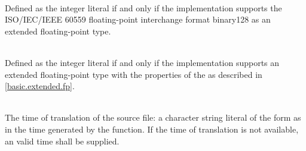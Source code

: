 \begin{description}
\item
{}%
\\
Defined as the integer literal 
if and only if the implementation supports
the ISO/IEC/IEEE 60559 floating-point interchange format binary128
as an extended floating-point type.

\item
{}%
\\
Defined as the integer literal 
if and only if the implementation supports an extended floating-point type
with the properties of the  
as described in \ref{basic.extended.fp}.

\item
{}%
\\
The time of translation of the source file:
a character string literal of the form
as in the time generated by the
function.
If the time of translation is not available,
an  valid time shall be supplied.
\end{description}

